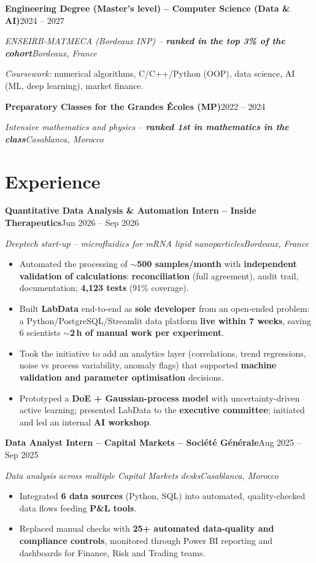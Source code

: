 \documentclass[a4paper,11pt]{article}
\newcommand{\entry}[4]{%
  \textbf{#1}\hfill #2\par
  \textit{#3}\hfill\textit{#4}\par}
\newcommand{\entrygap}{\par\vspace{3pt}}
\newenvironment{bullets}
  {\begin{itemize}[nosep, leftmargin=1em, itemsep=1pt, label=--]}
  {\end{itemize}}
\begin{document}
\entry{Engineering Degree (Master's level) – Computer Science (Data \& AI)}{2024 – 2027}
      {ENSEIRB-MATMECA (Bordeaux INP) – \textbf{ranked in the top 3\% of the cohort}}{Bordeaux, France}
\textit{Coursework:} numerical algorithms, C/C++/Python (OOP), data science, AI (ML, deep learning), market finance.
\entrygap

\entry{Preparatory Classes for the Grandes Écoles (MP)}{2022 – 2024}
      {Intensive mathematics and physics – \textbf{ranked 1st in mathematics in the class}}{Casablanca, Morocco}

\section{Experience}

\entry{Quantitative Data Analysis \& Automation Intern – Inside Therapeutics}{Jun 2026 – Sep 2026}
      {Deeptech start-up – microfluidics for mRNA lipid nanoparticles}{Bordeaux, France}
\begin{bullets}
\item Automated the processing of \textbf{$\sim$500 samples/month} with \textbf{independent validation of calculations}: \textbf{reconciliation} (full agreement), audit trail, documentation; \textbf{4,123 tests} (91\% coverage).
\item Built \textbf{LabData} end-to-end as \textbf{sole developer} from an open-ended problem: a Python/PostgreSQL/Streamlit data platform \textbf{live within 7 weeks}, saving 6 scientists \textbf{$\sim$2\,h of manual work per experiment}.
\item Took the initiative to add an analytics layer (correlations, trend regressions, noise vs process variability, anomaly flags) that supported \textbf{machine validation and parameter optimisation} decisions.
\item Prototyped a \textbf{DoE + Gaussian-process model} with uncertainty-driven active learning; presented LabData to the \textbf{executive committee}; initiated and led an internal \textbf{AI workshop}.
\end{bullets}
\entrygap

\entry{Data Analyst Intern – Capital Markets – Société Générale}{Aug 2025 – Sep 2025}
      {Data analysis across multiple Capital Markets desks}{Casablanca, Morocco}
\begin{bullets}
\item Integrated \textbf{6 data sources} (Python, SQL) into automated, quality-checked data flows feeding \textbf{P\&L tools}.
\item Replaced manual checks with \textbf{25+ automated data-quality and compliance controls}, monitored through Power BI reporting and dashboards for Finance, Risk and Trading teams.
\end{bullets}
\entrygap
\end{document}
